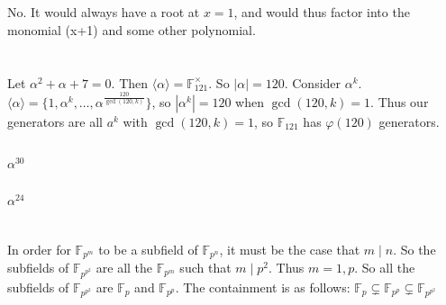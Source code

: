 \documentclass[11pt]{article}
\begin{document}
\subsection{} %
No.
It would always have a root at $x=1$, and would thus factor into the monomial (x+1) and some other polynomial.


\section{} %
\subsection{} %
Let $\alpha^2+\alpha+7=0$. Then $\langle\alpha\rangle=\mathbb{F}_{121}^\times$.
So $\left|\alpha\right|=120$.
Consider $\alpha^k$. $\langle\alpha\rangle=\{1,\alpha^k,\ldots,\alpha^\frac{120}{\gcd(120,k)}\}$, so $\left|\alpha^k\right|=120$ when $\gcd(120,k)=1$.
Thus our generators are all $a^k$ with $\gcd(120,k)=1$, so $\mathbb{F}_{121}$ has $\varphi(120)$ generators.


\subsection{} %
$\alpha^{30}$


\subsection{} %
$\alpha^{24}$


\section{} %
In order for $\mathbb{F}_{p^m}$ to be a subfield of $\mathbb{F}_{p^n}$, it must be the case that $m\mid n$.
So the subfields of $\mathbb{F}_{p^{p^2}}$ are all the $\mathbb{F}_{p^m}$ such that $m\mid p^2$.
Thus $m=1,p$.
So all the subfields of $\mathbb{F}_{p^{p^2}}$ are $\mathbb{F}_p$ and $\mathbb{F}_{p^p}$.
The containment is as follows: $\mathbb{F}_p\subsetneq\mathbb{F}_{p^p}\subsetneq\mathbb{F}_{p^{p^2}}$


\section{} %
\end{document}
